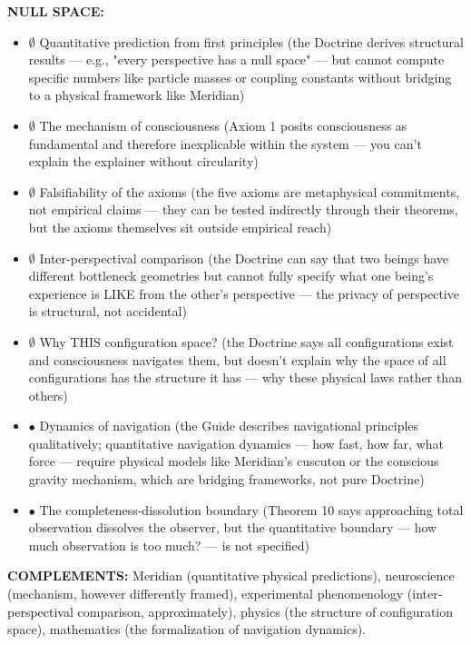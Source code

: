 \textbf{NULL SPACE:}

\begin{itemize}[nosep,leftmargin=*]
  \item $\emptyset$ Quantitative prediction from first principles (the Doctrine derives structural results — e.g., "every perspective has a null space" — but cannot compute specific numbers like particle masses or coupling constants without bridging to a physical framework like Meridian)
  \item $\emptyset$ The mechanism of consciousness (Axiom 1 posits consciousness as fundamental and therefore inexplicable within the system — you can't explain the explainer without circularity)
  \item $\emptyset$ Falsifiability of the axioms (the five axioms are metaphysical commitments, not empirical claims — they can be tested indirectly through their theorems, but the axioms themselves sit outside empirical reach)
  \item $\emptyset$ Inter-perspectival comparison (the Doctrine can say that two beings have different bottleneck geometries but cannot fully specify what one being's experience is LIKE from the other's perspective — the privacy of perspective is structural, not accidental)
  \item $\emptyset$ Why THIS configuration space? (the Doctrine says all configurations exist and consciousness navigates them, but doesn't explain why the space of all configurations has the structure it has — why these physical laws rather than others)
  \item $\bullet$ Dynamics of navigation (the Guide describes navigational principles qualitatively; quantitative navigation dynamics — how fast, how far, what force — require physical models like Meridian's cuscuton or the conscious gravity mechanism, which are bridging frameworks, not pure Doctrine)
  \item $\bullet$ The completeness-dissolution boundary (Theorem 10 says approaching total observation dissolves the observer, but the quantitative boundary — how much observation is too much? — is not specified)
\end{itemize}


\textbf{COMPLEMENTS:} Meridian (quantitative physical predictions), neuroscience (mechanism, however differently framed), experimental phenomenology (inter-perspectival comparison, approximately), physics (the structure of configuration space), mathematics (the formalization of navigation dynamics).


